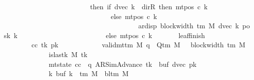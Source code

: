 \begin{isabellebody}
\ \ \ \ \ \ \ \ \ \ \ \ \ \ \ \ \ \ \ \ \ \ \ \ \ then\ {\isacharparenleft}{\kern0pt}if\ dvec\ k\ {\isacharequal}{\kern0pt}\ dir{\isachardot}{\kern0pt}R\ then\ mt{\isacharunderscore}{\kern0pt}pos\ c{}\ k\isanewline
\ \ \ \ \ \ \ \ \ \ \ \ \ \ \ \ \ \ \ \ \ \ \ \ \ \ \ \ \ \ \ else\ mt{\isacharunderscore}{\kern0pt}pos\ c{}\ k\isanewline
\ \ \ \ \ \ \ \ \ \ \ \ \ \ \ \ \ \ \ \ \ \ \ \ \ \ \ \ \ \ \ \ \ \ \ \ \ \ {\isacharminus}{\kern0pt}\ ar{\isacharunderscore}{\kern0pt}disp\ {\isacharparenleft}{\kern0pt}block{\isacharunderscore}{\kern0pt}width\ {\isacharparenleft}{\kern0pt}{\isasymGamma}{\isacharunderscore}{\kern0pt}tm\ M{\isacharparenright}{\kern0pt}{\isacharparenright}{\kern0pt}\ {\isacharparenleft}{\kern0pt}dvec\ k{\isacharparenright}{\kern0pt}\ {\isacharparenleft}{\kern0pt}posk{}\ k{\isacharparenright}{\kern0pt}{\isacharparenright}{\kern0pt}\isanewline
\ \ \ \ \ \ \ \ \ \ \ \ \ \ \ \ \ \ \ \ \ \ \ \ \ else\ mt{\isacharunderscore}{\kern0pt}pos\ c{}\ k{\isacharparenright}{\kern0pt}{\isacharparenright}{\kern0pt}{\isachardoublequoteclose}\isanewline
\ \ \ \ \ \ \ leaf{\isacharunderscore}{\kern0pt}finish{\isacharcolon}{\kern0pt}\isanewline
\ \ \ \ \ \ \ \ {\isachardoublequoteopen}{\isasymAnd}cc\ tk{\isacharprime}{\kern0pt}\ pk{\isacharprime}{\kern0pt}{\isachardot}{\kern0pt}\isanewline
\ \ \ \ \ \ \ \ \ \ \ {\isasymlbrakk}\ valid{\isacharunderscore}{\kern0pt}mttm\ M{\isacharsemicolon}{\kern0pt}\ q\ {\isasymin}\ Q{\isacharunderscore}{\kern0pt}tm\ M{\isacharsemicolon}{\kern0pt}\ {}\ {\isasymle}\ block{\isacharunderscore}{\kern0pt}width\ {\isacharparenleft}{\kern0pt}{\isasymGamma}{\isacharunderscore}{\kern0pt}tm\ M{\isacharparenright}{\kern0pt}{\isacharsemicolon}{\kern0pt}\isanewline
\ \ \ \ \ \ \ \ \ \ \ \ \ is{\isacharunderscore}{\kern0pt}last{\isacharunderscore}{\kern0pt}k\ M\ tk{\isacharprime}{\kern0pt}{\isacharsemicolon}{\kern0pt}\isanewline
\ \ \ \ \ \ \ \ \ \ \ \ \ mt{\isacharunderscore}{\kern0pt}state\ cc\ {\isacharequal}{\kern0pt}\ {\isacharparenleft}{\kern0pt}q{\isacharcomma}{\kern0pt}\ AR{\isacharunderscore}{\kern0pt}SimAdvance{\isacharcomma}{\kern0pt}\ tk{\isacharprime}{\kern0pt}{\isacharcomma}{\kern0pt}\ {}{\isacharcomma}{\kern0pt}\ buf{}{\isacharcomma}{\kern0pt}\ dvec{\isacharcomma}{\kern0pt}\ pk{\isacharprime}{\kern0pt}{\isacharparenright}{\kern0pt}{\isacharsemicolon}{\kern0pt}\isanewline
\ \ \ \ \ \ \ \ \ \ \ \ \ {\isasymforall}k{\isachardot}{\kern0pt}\ buf{}\ k\ {\isasymin}\ {\isasymGamma}{\isacharunderscore}{\kern0pt}tm\ M\ {\isasymunion}\ {\isacharbraceleft}{\kern0pt}bl{\isacharunderscore}{\kern0pt}tm\ M{\isacharbraceright}{\kern0pt}{\isacharsemicolon}{\kern0pt}\isanewline

\end{isabellebody}
